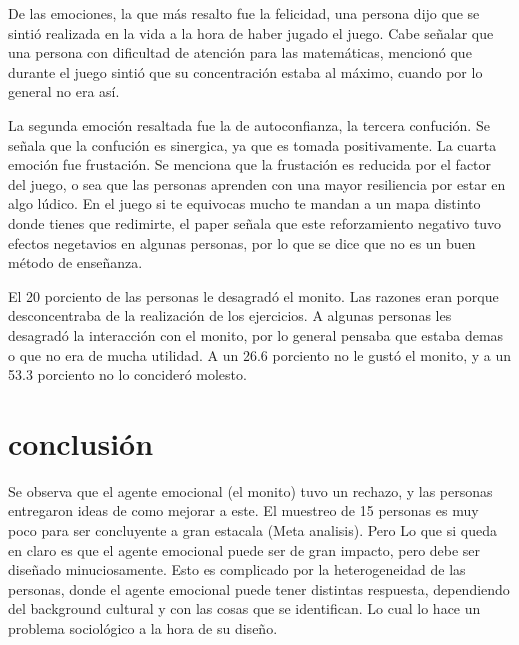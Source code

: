 \documentclass{book}
\begin{document}
    De las emociones, la que más resalto fue la felicidad, una persona dijo que se sintió realizada en la vida a la hora de haber jugado el juego.  Cabe señalar que una persona con dificultad de atención para las matemáticas, mencionó que durante el juego sintió que su concentración estaba al máximo, cuando por lo general no era así.
\newline
\newline


    La segunda emoción resaltada fue la de autoconfianza, la tercera confución. Se señala que la confución es sinergica, ya que es tomada positivamente. La cuarta emoción fue frustación. Se menciona que la frustación es reducida por el factor del juego, o sea que las personas aprenden con una mayor resiliencia por estar en algo lúdico. En el juego si te equivocas mucho te mandan a un mapa distinto donde tienes que redimirte, el paper señala que este reforzamiento negativo tuvo efectos negetavios en algunas personas, por lo que se dice que no es un buen método de enseñanza.
\newline
\newline


    El 20  porciento de las personas le desagradó el monito. Las razones eran porque desconcentraba de la realización de los ejercicios. A algunas personas les desagradó la interacción con el monito, por lo general pensaba que estaba demas o que no era de mucha utilidad. A un 26.6 porciento no le gustó el monito, y a un 53.3 porciento no lo concideró molesto.
\newline
\newline

\section{conclusión}
    Se observa que el agente emocional (el monito) tuvo un rechazo, y las personas entregaron ideas de como mejorar a este. El muestreo de 15 personas es muy poco para ser concluyente a gran estacala (Meta analisis). Pero Lo que si queda en claro es que el agente emocional puede ser de gran impacto, pero debe ser diseñado minuciosamente. Esto es complicado por la heterogeneidad de las personas, donde el agente emocional puede tener distintas respuesta, dependiendo del background cultural y con las cosas que se identifican. Lo cual lo hace un problema sociológico a la hora de su diseño.  
\end{document}
